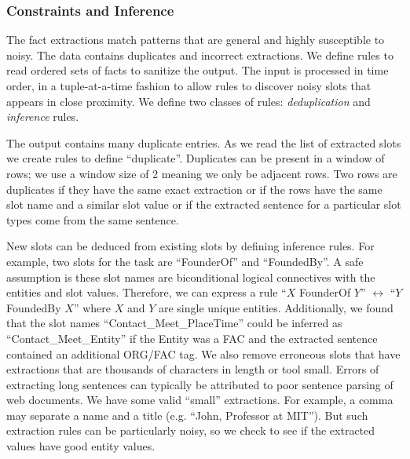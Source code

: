 \subsubsection{Constraints and Inference}

The fact extractions match patterns that are general and highly susceptible to noisy.
The data contains duplicates and incorrect extractions.
We define rules to read ordered sets of facts to sanitize the output.
The input is processed in time order, in a tuple-at-a-time fashion to allow rules to discover noisy slots 
that appears in close proximity.
We define two classes of rules: \textit{deduplication} and \textit{inference} rules.

The output contains many duplicate entries.
As we read the list of extracted slots we create rules to define ``duplicate''.
Duplicates can be present in a window of rows; we use a window size of 2 meaning we only be adjacent rows.
Two rows are duplicates if they have the same exact extraction or if the rows have the same slot name and a similar slot value or if the extracted sentence for a particular slot types come from the same sentence.

New slots can be deduced from existing slots by defining inference rules.
For example, two slots for the task are ``FounderOf'' and ``FoundedBy''.
A safe assumption is these slot names are biconditional logical connectives with the entities and slot values.
Therefore, we can express a rule ``$X$ FounderOf $Y$'' $\leftrightarrow$ ``$Y$ FoundedBy $X$'' where $X$ and $Y$ are single unique entities.
Additionally, we found that the slot names ``Contact\_Meet\_PlaceTime'' could be inferred as ``Contact\_Meet\_Entity'' if the Entity was a FAC and the extracted sentence contained an additional ORG/FAC tag.
We also remove erroneous slots that have extractions that are thousands of characters in length or tool small.
Errors of extracting long sentences can typically be attributed to poor sentence parsing of web documents.
We have some valid ``small'' extractions. For example, a comma may separate a name and a title (e.g. ``John, Professor at MIT'').
But such extraction rules can be particularly noisy, so we check to see if the extracted values have good entity values.
